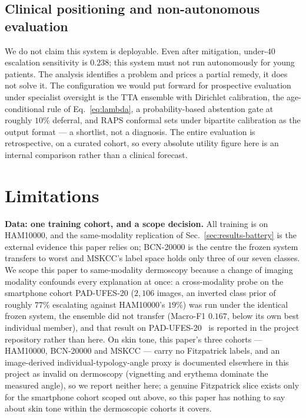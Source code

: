 \documentclass[journal]{IEEEtran}
\begin{document}
\subsection{Clinical positioning and non-autonomous evaluation}
We do not claim this system is deployable. Even after mitigation, under-$40$ escalation
sensitivity is $0.238$; this system must not run autonomously for young patients. The analysis
identifies a problem and prices a partial remedy, it does not solve it. The configuration we
would put forward for prospective evaluation under specialist oversight is the TTA ensemble
with Dirichlet calibration, the age-conditional rule of Eq.~\eqref{eq:lambda}, a
probability-based abstention gate at roughly $10\%$ deferral, and RAPS conformal sets under
bipartite calibration as the output format --- a shortlist, not a diagnosis. The entire
evaluation is retrospective, on a curated cohort, so every absolute utility figure here is an
internal comparison rather than a clinical forecast.

\section{Limitations}
\label{sec:limitations}

\textbf{Data: one training cohort, and a scope decision.} All training is on HAM10000, and the
same-modality replication of Sec.~\ref{sec:results-battery} is the external evidence this paper
relies on; BCN-20000 is the centre the frozen system transfers to worst and MSKCC's label space
holds only three of our seven classes. We scope this paper to same-modality dermoscopy because a
change of imaging modality confounds every explanation at once: a cross-modality probe on the
smartphone cohort PAD-UFES-20 ($2{,}106$ images, an inverted class prior of roughly $77\%$
escalating against HAM10000's $19\%$) was run under the identical frozen system, the ensemble
did not transfer (Macro-F1 $0.167$, below its own best individual member), and that result on
PAD-UFES-20~\cite{pacheco2020padufes} is reported in the project repository rather than here. On skin tone, this paper's three cohorts
--- HAM10000, BCN-20000 and MSKCC --- carry no Fitzpatrick labels, and an image-derived
individual-typology-angle proxy is documented elsewhere in this project as invalid on
dermoscopy (vignetting and erythema dominate the measured angle), so we report neither here; a
genuine Fitzpatrick slice exists only for the smartphone cohort scoped out above, so this paper
has nothing to say about skin tone within the dermoscopic cohorts it covers.
\end{document}
